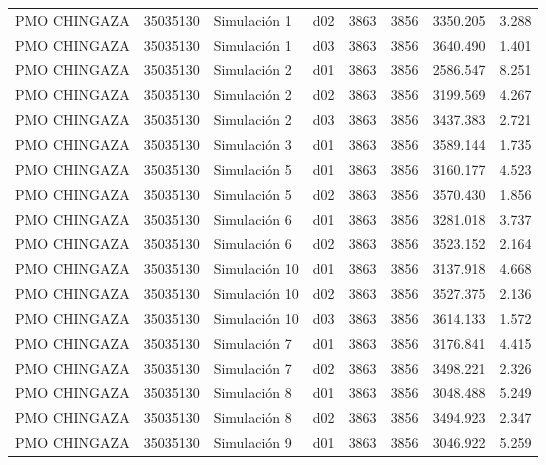 \begin{landscape}
\begin{longtable}{lrlp{2cm}p{2cm}p{3cm}p{2cm}r}
            PMO CHINGAZA &  35035130 &   Simulación 1 &   d02 &      3863 &     3856 &  3350.205 &     3.288 \\
            PMO CHINGAZA &  35035130 &   Simulación 1 &   d03 &      3863 &     3856 &  3640.490 &     1.401 \\
            PMO CHINGAZA &  35035130 &   Simulación 2 &   d01 &      3863 &     3856 &  2586.547 &     8.251 \\
            PMO CHINGAZA &  35035130 &   Simulación 2 &   d02 &      3863 &     3856 &  3199.569 &     4.267 \\
            PMO CHINGAZA &  35035130 &   Simulación 2 &   d03 &      3863 &     3856 &  3437.383 &     2.721 \\
            PMO CHINGAZA &  35035130 &   Simulación 3 &   d01 &      3863 &     3856 &  3589.144 &     1.735 \\
            PMO CHINGAZA &  35035130 &   Simulación 5 &   d01 &      3863 &     3856 &  3160.177 &     4.523 \\
            PMO CHINGAZA &  35035130 &   Simulación 5 &   d02 &      3863 &     3856 &  3570.430 &     1.856 \\
            PMO CHINGAZA &  35035130 &   Simulación 6 &   d01 &      3863 &     3856 &  3281.018 &     3.737 \\
            PMO CHINGAZA &  35035130 &   Simulación 6 &   d02 &      3863 &     3856 &  3523.152 &     2.164 \\
            PMO CHINGAZA &  35035130 &  Simulación 10 &   d01 &      3863 &     3856 &  3137.918 &     4.668 \\
            PMO CHINGAZA &  35035130 &  Simulación 10 &   d02 &      3863 &     3856 &  3527.375 &     2.136 \\
            PMO CHINGAZA &  35035130 &  Simulación 10 &   d03 &      3863 &     3856 &  3614.133 &     1.572 \\
            PMO CHINGAZA &  35035130 &   Simulación 7 &   d01 &      3863 &     3856 &  3176.841 &     4.415 \\
            PMO CHINGAZA &  35035130 &   Simulación 7 &   d02 &      3863 &     3856 &  3498.221 &     2.326 \\
            PMO CHINGAZA &  35035130 &   Simulación 8 &   d01 &      3863 &     3856 &  3048.488 &     5.249 \\
            PMO CHINGAZA &  35035130 &   Simulación 8 &   d02 &      3863 &     3856 &  3494.923 &     2.347 \\
            PMO CHINGAZA &  35035130 &   Simulación 9 &   d01 &      3863 &     3856 &  3046.922 &     5.259 \\

\end{longtable}
\end{landscape}
